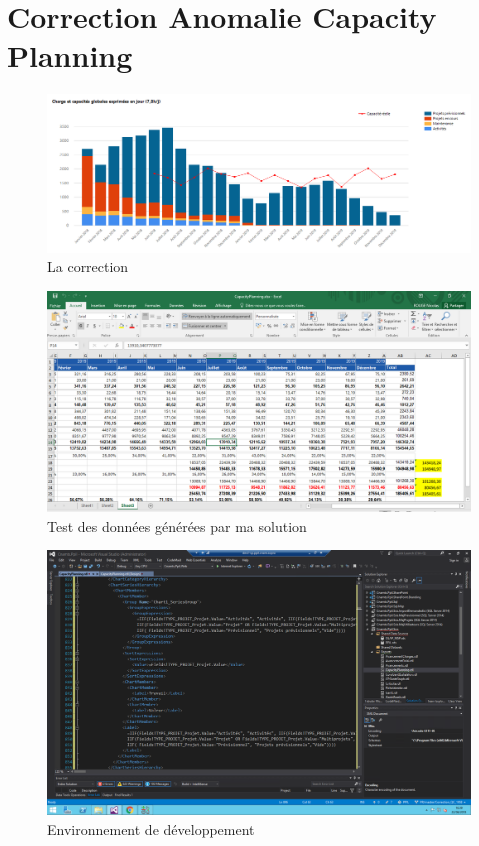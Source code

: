 \chapter{Correction Anomalie Capacity Planning}

\begin{figure}[H]
\centering
\includegraphics[width=1\textwidth]{images/capacity-planning-globales-jour.png}
\caption{La correction}
\end{figure}

\begin{figure}[H]
\centering
\includegraphics[width=1\textwidth]{images/excel-capacityplanning.png}
\caption{Test des données générées par ma solution}
\end{figure}

\begin{figure}[H]
\centering
\includegraphics[width=1\textwidth]{images/env-dev.png}
\caption{Environnement de développement}
\end{figure}